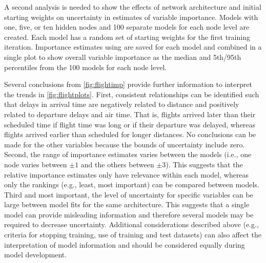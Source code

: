 \documentclass[article]{jss}
\begin{document}
A second analysis is needed to show the effects of network
architecture and initial starting weights on uncertainty in estimates
of variable importance. Models with one, five, or ten hidden nodes and
100 separate models for each node level are created.  Each model has
a random set of starting weights for the first training iteration.
Importance estimates using  are saved for each model and
combined in a single plot to show overall variable importance as the
median and 5th/95th percentiles from the 100 models for each node
level.

Several conclusions from \cref{fig:flightimp} provide further
information to interpret the trends in \cref{fig:flightplots}.  First,
consistent relationships can be identified such that delays in arrival
time are negatively related to distance and positively related to
departure delays and air time.  That is, flights arrived later than
their scheduled time if flight time was long or if their departure was
delayed, whereas flights arrived earlier than scheduled for longer
distances.  No conclusions can be made for the other variables because
the bounds of uncertainty include zero.  Second, the range of
importance estimates varies between the models (i.e., one node varies
between $\pm 1$ and the others between $\pm 3$).  This suggests that
the relative importance estimates only have relevance within each
model, whereas only the rankings (e.g., least, most important) can be
compared between models.  Third and most important, the level of
uncertainty for specific variables can be large between model fits for
the same architecture.  This suggests that a single model can provide
misleading information and therefore several models may be required to
decrease uncertainty.  Additional considerations described above
(e.g., criteria for stopping training, use of training and test
datasets) can also affect the interpretation of model information and
should be considered equally during model development.
\end{document}
